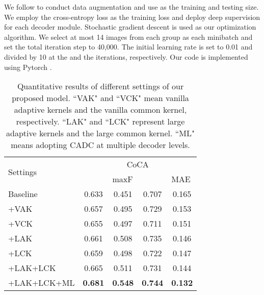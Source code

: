 \documentclass[10pt,twocolumn,letterpaper]{article}
\begin{document}
We follow \cite{liu2018picanet} to conduct data augmentation and use  as the training and testing size.
We employ the cross-entropy loss as the training loss and deploy deep supervision for each decoder module.
Stochastic gradient descent is used as our optimization algorithm.
We select at most 14 images from each group as each minibatch and set the total iteration step to 40,000. The initial learning rate is set to 0.01 and divided by 10 at the  and the  iterations, respectively.
Our code is implemented using Pytorch \cite{paszke2019pytorch}.

\begin{table}[t]
\centering
\renewcommand{\arraystretch}{1.0}
\renewcommand{\tabcolsep}{2.8mm}
\footnotesize
\caption{Quantitative results of different settings of our proposed model. ``VAK" and ``VCK" mean vanilla adaptive kernels and the vanilla common kernel, respectively. ``LAK" and ``LCK" represent large adaptive kernels and the large common kernel. ``ML" means adopting CADC at multiple decoder levels.}

\begin{tabular}{l|l|cccc}
\hline
\multicolumn{2}{l|}{\multirow{2}{*}{Settings}} & \multicolumn{4}{c}{CoCA} \\
\multicolumn{2}{l|}{}                      & \multicolumn{1}{l}{} & \multicolumn{1}{l}{maxF } & \multicolumn{1}{l}{} & \multicolumn{1}{l}{MAE }   \\ \hline

\multicolumn{2}{l|}{Baseline}  &0.633 &0.451 &0.707	&0.165  \\ \hline
\multicolumn{2}{l|}{+VAK}      &0.657 &0.495 &0.729	&0.153  \\
\multicolumn{2}{l|}{+VCK}      &0.655 &0.497 &0.711	&0.151   \\
\multicolumn{2}{l|}{+LAK}      &0.661 &0.508 &0.735	&0.146    \\
\multicolumn{2}{l|}{+LCK}      &0.659 &0.498 &0.722	&0.147\\
\multicolumn{2}{l|}{+LAK+LCK}  &0.665 &0.511 &0.731	&0.144  \\ \hline
\multicolumn{2}{l|}{+LAK+LCK+ML} &\textbf{0.681} &\textbf{0.548} &\textbf{0.744} &\textbf{0.132}\\ \hline
\end{tabular}
\label{kernel_ablation}
\end{table}
\end{document}
